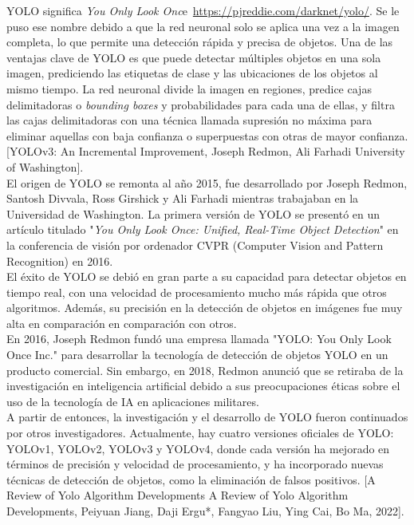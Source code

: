 YOLO significa \textit{You Only Look Onc}e\  \url{https://pjreddie.com/darknet/yolo/}. Se le puso ese nombre debido a que la red neuronal solo se aplica una vez a la imagen completa, lo que permite una detección rápida y precisa de objetos. Una de las ventajas clave de YOLO es que puede detectar múltiples objetos en una sola imagen, prediciendo las etiquetas de clase y las ubicaciones de los objetos al mismo tiempo. La red neuronal divide la imagen en regiones, predice cajas delimitadoras o \textit{bounding boxes} y probabilidades para cada una de ellas, y filtra las cajas delimitadoras con una técnica llamada supresión no máxima para eliminar aquellas con baja confianza o superpuestas con otras de mayor confianza. [YOLOv3: An Incremental Improvement, Joseph Redmon, Ali Farhadi University of Washington].\\

El origen de YOLO se remonta al año 2015, fue desarrollado por Joseph Redmon, Santosh Divvala, Ross Girshick y Ali Farhadi mientras trabajaban en la Universidad de Washington. La primera versión de YOLO se presentó en un artículo titulado "\textit{You Only Look Once: Unified, Real-Time Object Detection}" en la conferencia de visión por ordenador CVPR (Computer Vision and Pattern Recognition) en 2016. \\

El éxito de YOLO se debió en gran parte a su capacidad para detectar objetos en tiempo real, con una velocidad de procesamiento mucho más rápida que otros algoritmos. Además, su precisión en la detección de objetos en imágenes fue muy alta en comparación en comparación con otros.\\

En 2016, Joseph Redmon fundó una empresa llamada "YOLO: You Only Look Once Inc." para desarrollar la tecnología de detección de objetos YOLO en un producto comercial. Sin embargo, en 2018, Redmon anunció que se retiraba de la investigación en inteligencia artificial debido a sus preocupaciones éticas sobre el uso de la tecnología de IA en aplicaciones militares.\\

A partir de entonces, la investigación y el desarrollo de YOLO fueron continuados por otros investigadores. Actualmente, hay cuatro versiones oficiales de YOLO: YOLOv1, YOLOv2, YOLOv3 y YOLOv4, donde cada versión ha mejorado en términos de precisión y velocidad de procesamiento, y ha incorporado nuevas técnicas de detección de objetos, como la eliminación de falsos positivos. [A Review of Yolo Algorithm Developments A Review of Yolo Algorithm Developments, Peiyuan Jiang, Daji Ergu*, Fangyao Liu, Ying Cai, Bo Ma, 2022].\\

